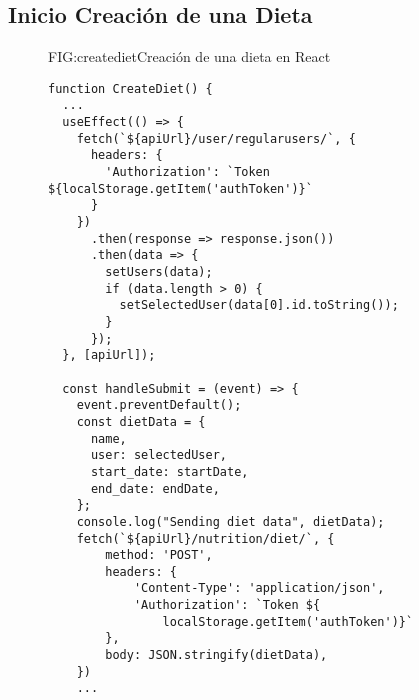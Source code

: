 \newpage

\subsection{Inicio Creación de una Dieta}

\begin{figure}[Creación de Dieta]{FIG:creatediet}{Creación de una dieta en React}
    \begin{verbatim}
function CreateDiet() {
  ...
  useEffect(() => {
    fetch(`${apiUrl}/user/regularusers/`, {
      headers: {
        'Authorization': `Token ${localStorage.getItem('authToken')}`
      }
    })
      .then(response => response.json())
      .then(data => {
        setUsers(data);
        if (data.length > 0) {
          setSelectedUser(data[0].id.toString());
        }
      });
  }, [apiUrl]);

  const handleSubmit = (event) => {
    event.preventDefault();
    const dietData = {
      name,
      user: selectedUser,
      start_date: startDate,
      end_date: endDate,
    };
    console.log("Sending diet data", dietData);
    fetch(`${apiUrl}/nutrition/diet/`, {
        method: 'POST',
        headers: {
            'Content-Type': 'application/json',
            'Authorization': `Token ${
                localStorage.getItem('authToken')}`
        },
        body: JSON.stringify(dietData),
    })
    ...
    \end{verbatim}
    \end{figure}

\newpage


